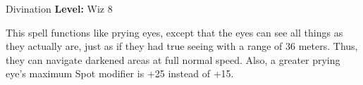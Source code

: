 {Divination}
{
	\textbf{Level:}
	Wiz 8\\
}
{
	This spell functions like prying eyes, except that the eyes can see all things as they actually are, just as if they had true seeing with a range of 36 meters. Thus, they can navigate darkened areas at full normal speed. Also, a greater prying eye's maximum Spot modifier is +25 instead of +15.

}
